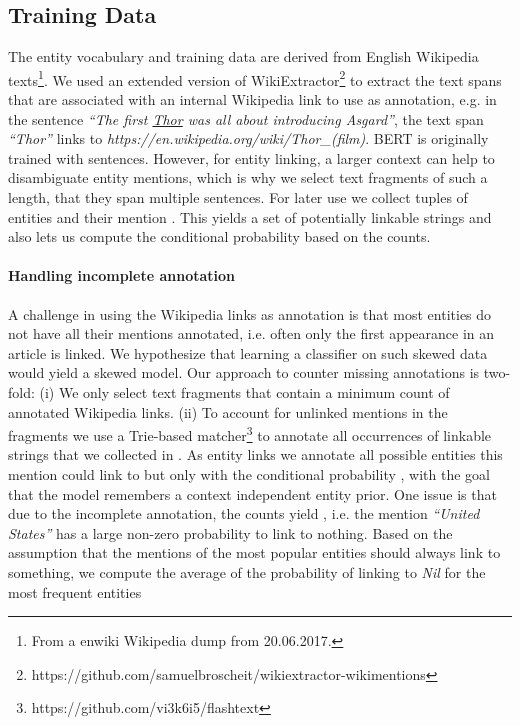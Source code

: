 \documentclass[11pt,a4paper]{article}
\begin{document}
\subsection{Training Data}
\label{sec:training_data}

The entity vocabulary and training data are derived from English Wikipedia texts\footnote{From a enwiki Wikipedia dump from 20.06.2017.}. We used an extended version of WikiExtractor\footnote{https://github.com/samuelbroscheit/wikiextractor-wikimentions} to extract the text spans that are associated with an internal Wikipedia link to use as annotation, e.g. in the sentence \textit{``The first \underline{Thor} was all about introducing Asgard''}, the text span \textit{``Thor''} links to \textit{https://en.wikipedia.org/wiki/Thor\_(film)}. BERT is originally trained with sentences. However, for entity linking, a larger context can help to disambiguate entity mentions, which is why we select text fragments of such a length, that they span multiple sentences. For later use we collect  tuples of entities  and their mention . This yields a set  of potentially linkable strings and also lets us compute the conditional probability  based on the  counts.  


\paragraph{Handling incomplete annotation} A challenge in using the Wikipedia links as annotation is that most entities do not have all their mentions annotated, i.e. often only the first appearance in an article is linked. We hypothesize that learning a classifier on such skewed data would yield a skewed model. Our approach to counter missing annotations is two-fold: (i) We only select text fragments that contain a minimum count of annotated Wikipedia links. (ii) To account for unlinked mentions in the fragments we use a Trie-based matcher\footnote{https://github.com/vi3k6i5/flashtext} to annotate all occurrences of  linkable strings that we collected in . As entity links we annotate all possible entities this mention could link to but only with the conditional probability , with the goal that the model remembers a context independent entity prior. One issue is that due to the incomplete annotation, the  counts yield , i.e. the mention \textit{``United States''} has a large non-zero probability to link to nothing. Based on the assumption that the mentions of the most popular entities should always link to something, we compute the average of the probability of linking to \textit{Nil} for the  most frequent entities 
 
\end{document}
